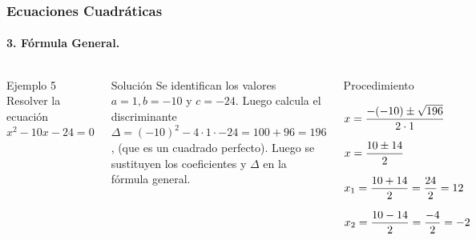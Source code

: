 \documentclass[mathserif]{beamer}
\begin{document}
\begin{frame}
\frametitle{\bf Ecuaciones Cuadráticas} 
\framesubtitle{3. Fórmula General.}

    \begin{columns}
        \begin{exampleblock}{Ejemplo 5}
        \bc
        Resolver la ecuación $x^2-10x-24=0$
        \ec
        \end{exampleblock}
\pause
        \begin{block}{Solución}
        Se identifican los valores $a=1, b=-10$ y $c=-24$. Luego calcula el discriminante \alert<2>{$\Delta=(-10)^2-4\cdot 1\cdot -24=100+96=196$}, (que es un cuadrado perfecto). Luego se sustituyen los coeficientes  y $\Delta$ en la fórmula general.
        \end{block}
\pause
        \begin{block}{Procedimiento}
            \benu
            \item[] <4-| alert@4>$\displaystyle x=\frac{-(-10)\pm\sqrt{196}}{2\cdot 1}$
            \item[] <5-| alert@5>$\displaystyle x=\frac{10\pm 14}{2}$
            \item[] <6-| alert@6>$\displaystyle x_1=\frac{10+14}{2}=\frac{24}{2}=12$
            \item[] <7-| alert@7>$\displaystyle x_2=\frac{10-14}{2}=\frac{-4}{2}=-2$
            \eenu
            \pause
        \end{block}
    \end{columns}
\end{frame}
\end{document}
